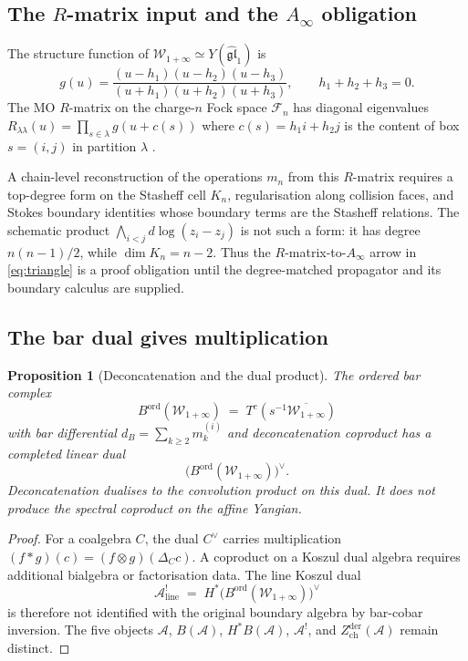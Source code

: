 \documentclass[11pt]{article}
\newtheorem{proposition}[theorem]{Proposition}
\theoremstyle{remark}
\providecommand{\cA}{\mathcal{A}}
\providecommand{\fgl}{\mathfrak{gl}}
\begin{document}
\subsection*{The $R$-matrix input and the $A_\infty$ obligation}

The structure function of $\mathcal{W}_{1+\infty} \simeq
Y(\widehat{\fgl}_1)$ is
\begin{equation}\label{eq:structure-fn}
g(u) = \frac{(u - h_1)(u - h_2)(u - h_3)}{(u + h_1)(u + h_2)(u + h_3)},
\qquad h_1 + h_2 + h_3 = 0.
\end{equation}
The MO $R$-matrix on the charge-$n$ Fock space $\mathcal{F}_n$ has
diagonal eigenvalues
$R_{\lambda\lambda}(u) = \prod_{s \in \lambda} g(u + c(s))$
where $c(s) = h_1 i + h_2 j$ is the content of box $s = (i,j)$
in partition $\lambda$ \cite{Vol3}.

A chain-level reconstruction of the operations $m_n$ from this
$R$-matrix requires a top-degree form on the Stasheff cell $K_n$,
regularisation along collision faces, and Stokes boundary identities
whose boundary terms are the Stasheff relations.  The schematic product
$\bigwedge_{i<j}d\log(z_i-z_j)$ is not such a form: it has degree
$n(n-1)/2$, while $\dim K_n=n-2$.  Thus the $R$-matrix-to-$A_\infty$
arrow in \eqref{eq:triangle} is a proof obligation until the
degree-matched propagator and its boundary calculus are supplied.

\subsection*{The bar dual gives multiplication}

\begin{proposition}[Deconcatenation and the dual product]
\label{constr:beta}
The ordered bar complex
\[
B^{\mathrm{ord}}(\mathcal{W}_{1+\infty})
\;=\;
T^c(s^{-1}\overline{\mathcal{W}_{1+\infty}})
\]
with bar differential $d_B = \sum_{k \ge 2} m_k^{(i)}$ and
deconcatenation coproduct has a completed linear dual
\[
\bigl(B^{\mathrm{ord}}(\mathcal{W}_{1+\infty})\bigr)^\vee.
\]
Deconcatenation dualises to the convolution product on this dual.  It
does not produce the spectral coproduct on the affine Yangian.
\end{proposition}

\begin{proof}
For a coalgebra $C$, the dual $C^\vee$ carries multiplication
$(f*g)(c)=(f\otimes g)(\Delta_Cc)$.  A coproduct on a Koszul dual
algebra requires additional bialgebra or factorisation data.  The line
Koszul dual
\[
\cA^!_{\mathrm{line}}
\;=\;
H^*\bigl(B^{\mathrm{ord}}(\mathcal{W}_{1+\infty})\bigr)^\vee
\]
is therefore not identified with the original boundary algebra by
bar-cobar inversion.  The five objects
$\cA$, $B(\cA)$, $H^\ast B(\cA)$, $\cA^!$, and
$Z^{\mathrm{der}}_{\mathrm{ch}}(\cA)$ remain distinct.
\end{proof}
\end{document}
